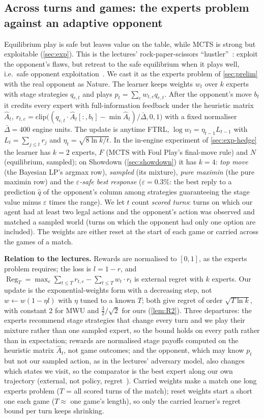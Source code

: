 \documentclass[10pt]{article}
\theoremstyle{plain}
\theoremstyle{definition}
\theoremstyle{remark}
\newcommand{\Ahat}{\hat A}
\newcommand{\Dbar}{\bar\Delta}
\DeclareMathOperator{\Reg}{Reg}
\begin{document}
\subsection{Across turns and games: the experts problem against an adaptive opponent}
\label{sec:hedge}
Equilibrium play is safe but leaves value on the table, while MCTS is strong but exploitable (\cref{sec:exp}). This is the lectures' rock-paper-scissors ``hustler''~\cite{CS535L6}: exploit the opponent's flaws, but retreat to the safe equilibrium when it plays well, i.e.\ safe opponent exploitation~\cite{Gan15}. We cast it as the experts problem of \cref{sec:prelim} with the real opponent as Nature. The learner keeps weights $w_t$ over $k$ experts with stage strategies $q_{e,t}$ and plays $p_t=\sum_e w_{t,e}q_{e,t}$. After the opponent's move $b_t$ it credits every expert with full-information feedback under the heuristic matrix $\Ahat_t$,
$r_{t,e}=\mathrm{clip}\big((q_{e,t}\cdot\Ahat_t[:,b_t]-\min\Ahat_t)/\Dbar,0,1\big)$ with a fixed normaliser $\Dbar=400$ engine units. The update is anytime FTRL, $\log w_t=\eta_{t-1}L_{t-1}$ with $L_t=\sum_{j\le t}r_j$ and $\eta_t=\sqrt{8\ln k/t}$. In the in-engine experiment of \cref{sec:exp-hedge} the learner has $k=2$ experts, $F$ (MCTS with Foul Play's final-move rule) and $N$ (equilibrium, sampled); on Showdown (\cref{sec:showdown}) it has $k=4$: \emph{top move} (the Bayesian LP's argmax row), \emph{sampled} (its mixture), \emph{pure maximin} (the pure maximin row) and the \emph{$\varepsilon$-safe best response} ($\varepsilon=0.3\%$: the best reply to a prediction $\hat q$ of the opponent's column among strategies guaranteeing the stage value minus $\varepsilon$ times the range). We let $t$ count \emph{scored turns}: turns on which our agent had at least two legal actions and the opponent's action was observed and matched a sampled world (turns on which the opponent had only one option are included). The weights are either reset at the start of each game or carried across the games of a match.

\textbf{Relation to the lectures.} Rewards are normalised to $[0,1]$, as the experts problem requires; the loss is $l=1-r$, and $\Reg_T=\max_e\sum_{t\le T}r_{t,e}-\sum_{t\le T}w_t\cdot r_t$ is external regret with $k$ experts. Our update is the exponential-weights form with a decreasing step, not $w\leftarrow w(1-\eta l)$ with $\eta$ tuned to a known $T$; both give regret of order $\sqrt{T\ln k}$, with constant 2 for MWU and $\frac32/\sqrt2$ for ours (\cref{lem:R2}). Three departures: the experts recommend stage strategies that change every turn and we play their mixture rather than one sampled expert, so the bound holds on every path rather than in expectation; rewards are normalised stage payoffs computed on the heuristic matrix $\Ahat_t$, not game outcomes; and the opponent, which may know $p_t$ but not our sampled action, as in the lectures' adversary model, also changes which states we visit, so the comparator is the best expert along our own trajectory (external, not policy, regret~\cite{Aro12b}). Carried weights make a match one long experts problem ($T$ = all scored turns of the match); reset weights start a short one each game ($T\approx$ one game's length), so only the carried learner's regret bound per turn keeps shrinking.
\end{document}
